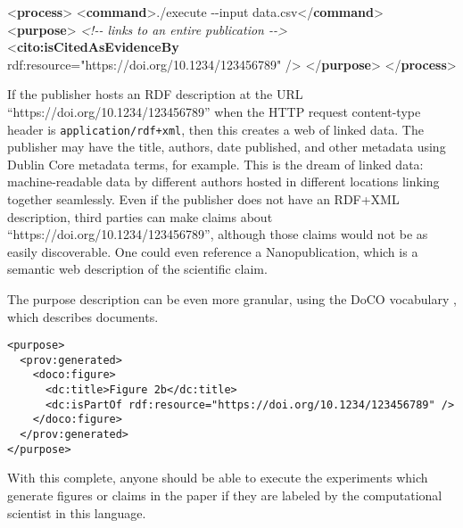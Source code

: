 \documentclass[natbib=false,manuscript,authordraft]{acmart}
\newenvironment{Shaded}{}{}
\newcommand{\CommentTok}[1]{\textcolor[rgb]{0.38,0.63,0.69}{\textit{#1}}}
\newcommand{\KeywordTok}[1]{\textcolor[rgb]{0.00,0.44,0.13}{\textbf{#1}}}
\newcommand{\NormalTok}[1]{#1}
\newcommand{\OtherTok}[1]{\textcolor[rgb]{0.00,0.44,0.13}{#1}}
\newcommand{\StringTok}[1]{\textcolor[rgb]{0.25,0.44,0.63}{#1}}
\begin{document}
\begin{Shaded}
\begin{Highlighting}[]
\NormalTok{\textless{}}\KeywordTok{process}\NormalTok{\textgreater{}}
\NormalTok{  \textless{}}\KeywordTok{command}\NormalTok{\textgreater{}./execute {-}{-}input data.csv\textless{}/}\KeywordTok{command}\NormalTok{\textgreater{}}
\NormalTok{  \textless{}}\KeywordTok{purpose}\NormalTok{\textgreater{}}
    \CommentTok{\textless{}!{-}{-} links to an entire publication {-}{-}\textgreater{}}
\NormalTok{    \textless{}}\KeywordTok{cito:isCitedAsEvidenceBy}\OtherTok{ rdf:resource=}\StringTok{"https://doi.org/10.1234/123456789"}\NormalTok{ /\textgreater{}}
\NormalTok{  \textless{}/}\KeywordTok{purpose}\NormalTok{\textgreater{}}
\NormalTok{\textless{}/}\KeywordTok{process}\NormalTok{\textgreater{}}
\end{Highlighting}
\end{Shaded}

\normalsize

If the publisher hosts an RDF description at the URL
``https://doi.org/10.1234/123456789'' when the HTTP request content-type
header is \texttt{application/rdf+xml}, then this creates a web of
linked data. The publisher may have the title, authors, date published,
and other metadata using Dublin Core metadata terms, for example. This
is the dream of linked data: machine-readable data by different authors
hosted in different locations linking together seamlessly. Even if the
publisher does not have an RDF+XML description, third parties can make
claims about ``https://doi.org/10.1234/123456789'', although those
claims would not be as easily discoverable. One could even reference a
Nanopublication, which is a semantic web description of the scientific
claim.

The purpose description can be even more granular, using the DoCO
vocabulary \cite{constantin_document_2016}, which describes documents.

\small

\begin{verbatim}
<purpose>
  <prov:generated>
    <doco:figure>
      <dc:title>Figure 2b</dc:title>
      <dc:isPartOf rdf:resource="https://doi.org/10.1234/123456789" />
    </doco:figure>
  </prov:generated>
</purpose>
\end{verbatim}

\normalsize

With this complete, anyone should be able to execute the experiments
which generate figures or claims in the paper if they are labeled by the
computational scientist in this language.
\end{document}
